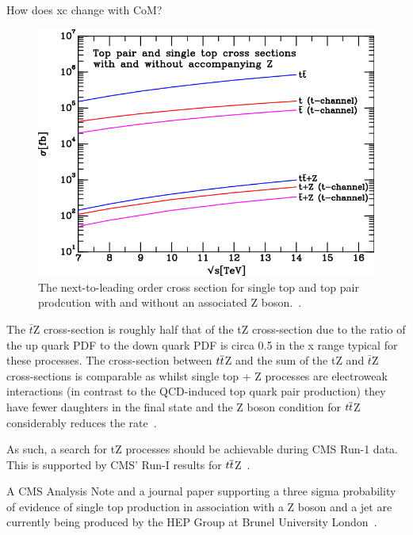 How does xc change with CoM?

\begin{figure}[h]
\centering
\includegraphics{figs/sm/tzq/TplusZtot.png}
\caption{The next-to-leading order cross section for single top and top pair prodcution with and without an associated Z boson.~\cite{Campbell:2013yla}.
}
\label{fig:topCrossSections}
\end{figure}



The $\bar{t}$Z cross-section is roughly half that of the tZ cross-section due to the ratio of the up quark PDF to the down quark PDF is circa 0.5 in the x range typical for these processes\cite{Campbell:2013yla}. 
The cross-section between $t\overline{t}$Z and the sum of the tZ and $\bar{t}$Z cross-sections is comparable as whilst single top + Z processes are electroweak interactions (in contrast to the QCD-induced top quark pair production) they have fewer daughters in the final state and the Z boson condition for $t\overline{t}$Z considerably reduces the rate~\cite{Campbell:2013yla}.

As such, a search for tZ processes should be achievable during CMS Run-1 data. This is supported by CMS’ Run-I results for $t\overline{t}$Z~\cite{Khachatryan:2014ewa}. 

A CMS Analysis Note and a journal paper supporting a three sigma probability of evidence of single top production in association with a Z boson and a jet are currently being produced by the HEP Group at Brunel University London~\cite{Sirunyan:2017kkr}.

